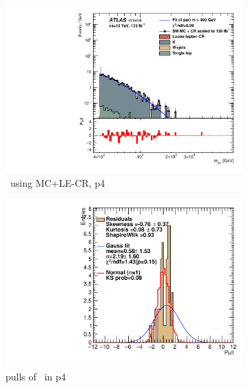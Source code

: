 \newpage

\begin{figure}[ht]
    \centering
    \begin{subfigure}[h]{0.38\linewidth}
    \includegraphics[scale=0.3]{figs/ch6/fit/variable_nosmooth/p4/01PB/output_SMMCplusCR_Mbm_p4.pdf}%
    \caption{\mbmu \ using MC+LE-CR, p4}
    \end{subfigure}
    \hfill
    \begin{subfigure}[h]{0.4\linewidth}
    \includegraphics[scale=0.32]{figs/ch6/fit/variable_nosmooth/p4/01PB/pull_SMMCplusCR_Mbm_p4.pdf}%
    \caption{pulls of \mbmu \ in p4}
    \end{subfigure}
    \hfill
    \begin{subfigure}[h]{0.38\linewidth}

\end{subfigure}
\end{figure}
